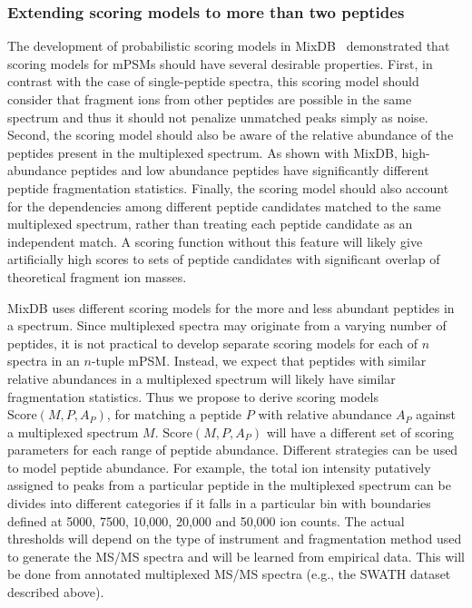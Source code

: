 \documentclass[arial,11pt]{article}
\begin{document}
\subsubsection{Extending scoring models to more than two peptides}

The development of probabilistic scoring models in MixDB~\cite{wang2011peptide} demonstrated that scoring models for mPSMs should have several desirable properties. First, in contrast with the case of single-peptide spectra, this scoring model should consider that fragment ions from other peptides are possible in the same spectrum and thus it should not penalize unmatched peaks simply as noise.  Second, the scoring model should also be aware of the relative abundance of the peptides present in the multiplexed spectrum.  As shown with MixDB, high-abundance peptides and low abundance peptides have significantly different peptide fragmentation statistics. Finally, the scoring model should also account for the dependencies among different peptide candidates matched to the same multiplexed spectrum, rather than treating each peptide candidate as an independent match.  A scoring function without this feature will likely give artificially high scores to sets of peptide candidates with significant overlap of theoretical fragment ion masses.

MixDB uses different scoring models for the more and less abundant peptides in a spectrum.
Since multiplexed spectra  may originate from a varying number of peptides, it is not practical to develop separate scoring models for each of $n$ spectra in an $n$-tuple mPSM.  Instead, we expect that peptides with similar relative abundances in a multiplexed spectrum will likely have similar fragmentation statistics.  Thus we propose to derive scoring models $\text{Score}(M,P,A_{P})$, for matching a peptide $P$ with relative abundance $A_{P}$ against a multiplexed spectrum $M$. $\text{Score}(M,P,A_{P})$ will have a different set of scoring parameters for each range of peptide abundance.  Different strategies can be used to model peptide abundance. For example, the total ion intensity putatively assigned to peaks from a particular peptide in the multiplexed spectrum can be divides into different categories if it falls in a particular bin with boundaries defined at 5000, 7500, 10,000, 20,000 and 50,000 ion counts. The actual thresholds will depend on the type of instrument and fragmentation method used to generate the MS/MS spectra and will be learned from empirical data.
This will be done from annotated multiplexed MS/MS spectra (e.g., the SWATH dataset described above).
\end{document}
